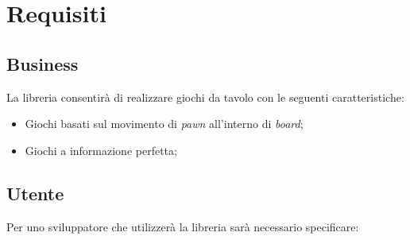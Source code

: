 \section{Requisiti}




\subsection{Business}

La libreria consentirà di realizzare giochi da tavolo con le seguenti caratteristiche:

\begin{itemize}
    \item Giochi basati sul movimento di \textit{pawn} all'interno di \textit{board};
    \item Giochi a informazione perfetta; %
\end{itemize}

\subsection{Utente}

Per uno sviluppatore che utilizzerà la libreria sarà necessario specificare:

